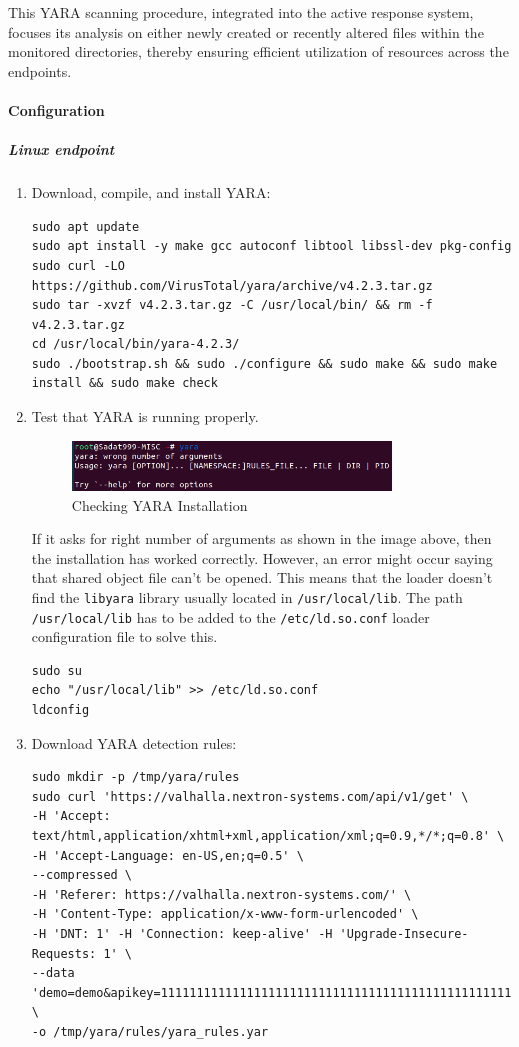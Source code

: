 This YARA scanning procedure, integrated into the active response system, focuses its analysis on either newly created or recently altered files within the monitored directories, thereby ensuring efficient utilization of resources across the endpoints.

\paragraph{Configuration}

\subparagraph{Linux endpoint}
\begin{enumerate}
    \item Download, compile, and install YARA:
    \begin{verbatim}
sudo apt update
sudo apt install -y make gcc autoconf libtool libssl-dev pkg-config
sudo curl -LO https://github.com/VirusTotal/yara/archive/v4.2.3.tar.gz
sudo tar -xvzf v4.2.3.tar.gz -C /usr/local/bin/ && rm -f v4.2.3.tar.gz
cd /usr/local/bin/yara-4.2.3/
sudo ./bootstrap.sh && sudo ./configure && sudo make && sudo make install && sudo make check
    \end{verbatim}

    \item Test that YARA is running properly.
\begin{figure}[H]
    \centering
    \includegraphics[width=0.8\textwidth]{images/malware-detection/yara/1.png}
    \caption{Checking YARA Installation}
    \label{fig:yara-check}
\end{figure}
    If it asks for right number of arguments as shown in the image above, then the installation has worked correctly. However, an error might occur saying that shared object file can't be opened. This means that the loader doesn’t find the \texttt{libyara} library usually located in \texttt{/usr/local/lib}. The path \texttt{/usr/local/lib} has to be added to the \texttt{/etc/ld.so.conf} loader configuration file to solve this.
    \begin{verbatim}
sudo su
echo "/usr/local/lib" >> /etc/ld.so.conf
ldconfig
    \end{verbatim}

    \item Download YARA detection rules:
    \begin{verbatim}
sudo mkdir -p /tmp/yara/rules
sudo curl 'https://valhalla.nextron-systems.com/api/v1/get' \
-H 'Accept: text/html,application/xhtml+xml,application/xml;q=0.9,*/*;q=0.8' \
-H 'Accept-Language: en-US,en;q=0.5' \
--compressed \
-H 'Referer: https://valhalla.nextron-systems.com/' \
-H 'Content-Type: application/x-www-form-urlencoded' \
-H 'DNT: 1' -H 'Connection: keep-alive' -H 'Upgrade-Insecure-Requests: 1' \
--data 'demo=demo&apikey=1111111111111111111111111111111111111111111111111111111111111111&format=text' \
-o /tmp/yara/rules/yara_rules.yar
    \end{verbatim}


\end{enumerate}
